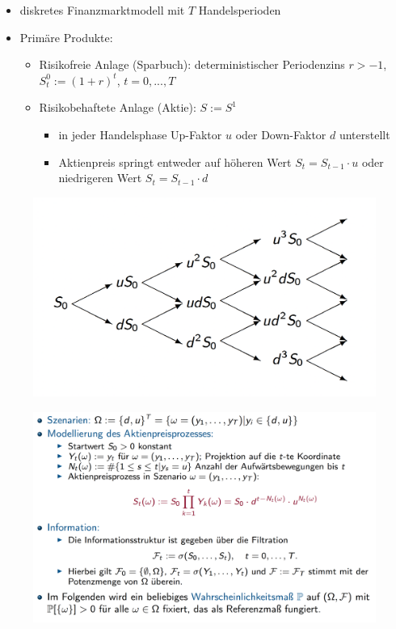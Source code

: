\documentclass[12pt]{report}
\theoremstyle{dotless}
\theoremstyle{definition}
\begin{document}
\begin{itemize}
	\item diskretes Finanzmarktmodell mit $T$ Handelsperioden
	\item Prim\"are Produkte:
	\begin{itemize}
		\item Risikofreie Anlage (Sparbuch): deterministischer Periodenzins $r>-1$, \\ $S_t^0 := (1+r)^t$, $t=0,...,T$
		\item Risikobehaftete Anlage (Aktie): $S:=S^1$
		\begin{itemize}
			\item in jeder Handelsphase Up-Faktor $u$ oder Down-Faktor $d$ unterstellt
			\item Aktienpreis springt entweder auf h\"oheren Wert $S_t = S_{t-1} \cdot u$ oder niedrigeren Wert $S_t = S_{t-1} \cdot d$
		\end{itemize}
	\end{itemize}
\end{itemize}

\begin{figure}[H]
\centering
\includegraphics[width=\textwidth]{Bilder/BinomialmodellUpDown.png}
\end{figure}

\begin{figure}[H]
\centering
\includegraphics[width=\textwidth]{Bilder/FormaleKonstruktion.png}
\end{figure}
\end{document}
